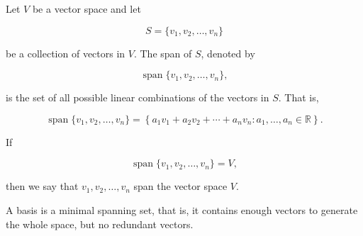 \begin{definition}[Span]
	Let \(V\) be a vector space and let

	\begin{equation}
		S=\{v_1,v_2,\ldots,v_n\}
		\label{eq:span-1}
	\end{equation}

	be a collection of vectors in \(V\). The span of \(S\), denoted by

	\begin{equation}
		\operatorname{span}\{v_1,v_2,\ldots,v_n\},
		\label{eq:span-2}
	\end{equation}

	is the set of all possible linear combinations of the vectors in \(S\). That is,

	\begin{equation}
		\operatorname{span}\{v_1,v_2,\ldots,v_n\}
		=
		\left\{
		a_1v_1+a_2v_2+\cdots+a_nv_n:
		a_1,\ldots,a_n\in\mathbb{R}
		\right\}.
		\label{eq:span-3}
	\end{equation}

	If

	\begin{equation}
		\operatorname{span}\{v_1,v_2,\ldots,v_n\}=V,
		\label{eq:span-4}
	\end{equation}

	then we say that \(v_1,v_2,\ldots,v_n\) span the vector space \(V\).
\end{definition}

A basis is a minimal spanning set, that is, it contains enough vectors to generate the whole space, but no redundant vectors.


